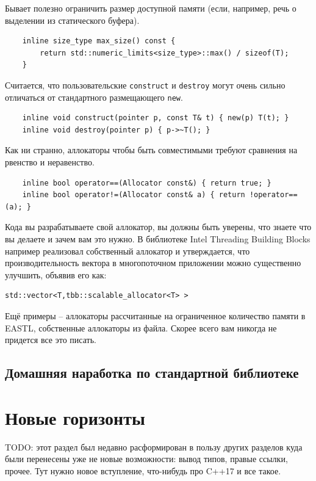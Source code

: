 \documentclass[a4paper,12pt,oneside]{article}
\begin{document}
Бывает полезно ограничить размер доступной памяти (если, например, речь о выделении из статического буфера).

\begin{lstlisting}
    inline size_type max_size() const { 
        return std::numeric_limits<size_type>::max() / sizeof(T);
    }
\end{lstlisting}

Считается, что пользовательские \lstinline!construct! и \lstinline!destroy! могут очень сильно отличаться от стандартного размещающего \lstinline!new!.

\begin{lstlisting}
    inline void construct(pointer p, const T& t) { new(p) T(t); }
    inline void destroy(pointer p) { p->~T(); }
\end{lstlisting}

Как ни странно, аллокаторы чтобы быть совместимыми требуют сравнения на рвенство и неравенство.

\begin{lstlisting}
    inline bool operator==(Allocator const&) { return true; }
    inline bool operator!=(Allocator const& a) { return !operator==(a); }
\end{lstlisting}

Кода вы разрабатываете свой аллокатор, вы должны быть уверены, что знаете что вы делаете и зачем вам это нужно. В библиотеке Intel Threading Building Blocks например реализовал собственный аллокатор и утверждается, что производительность вектора в многопоточном приложении можно существенно улучшить, объявив его как:

\begin{lstlisting}
std::vector<T,tbb::scalable_allocator<T> >
\end{lstlisting}

Ещё примеры -- аллокаторы рассчитанные на ограниченное количество памяти в EASTL, собственные аллокаторы из файла. Скорее всего вам никогда не придется все это писать.

\pagebreak
\subsection{Домашняя наработка по стандартной библиотеке}

\pagebreak
\section{Новые горизонты}

TODO: этот раздел был недавно расформирован в пользу других разделов куда были перенесены уже не новые возможности: вывод типов, правые ссылки, прочее. Тут нужно новое вступление, что-нибудь про C++17 и все такое.
\end{document}
